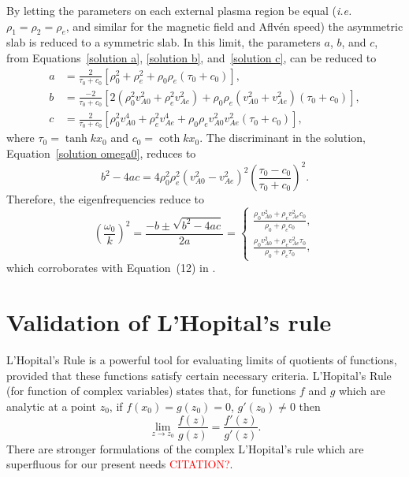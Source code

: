 \documentclass{aastex61}
\begin{document}
By letting the parameters on each external plasma region be equal (\textit{i.e.} $\rho_1 = \rho_2 = \rho_e$, and similar for the magnetic field and Aflv\'{e}n speed) the asymmetric slab is reduced to a symmetric slab. In this limit, the parameters $a$, $b$, and $c$, from Equations~\eqref{solution a}, \eqref{solution b}, and~\eqref{solution c}, can be reduced to
\begin{align}
a &= \frac{2}{\tau_0 + c_0} \left[ \rho_0^2 + \rho_e^2 + \rho_0\rho_e(\tau_0 + c_0) \right], \\
b &= \frac{-2}{\tau_0 + c_0} \left[ 2(\rho_0^2v_{A0}^2 + \rho_e^2v_{Ae}^2) + \rho_0\rho_e(v_{A0}^2 + v_{Ae}^2)(\tau_0 + c_0) \right], \\
c &= \frac{2}{\tau_0 + c_0} \left[ \rho_0^2v_{A0}^4 + \rho_e^2v_{Ae}^4 + \rho_0\rho_ev_{A0}^2v_{Ae}^2(\tau_0 + c_0) \right],
\end{align}
where $\tau_0 = \tanh{kx_0}$ and $c_0 = \coth{kx_0}$. The discriminant in the solution, Equation~\eqref{solution omega0}, reduces to
\begin{equation}
b^2 - 4ac = 4\rho_0^2\rho_e^2(v_{A0}^2 - v_{Ae}^2)^2 \left(\frac{\tau_0 - c_0}{\tau_0 + c_0}\right)^2. 
\end{equation}
Therefore, the eigenfrequencies reduce to
\begin{equation}
\left(\frac{\omega_0}{k}\right)^2 = \frac{-b \pm \sqrt{b^2 - 4ac}}{2a} =
\begin{cases}
\frac{\rho_0v_{A0}^2 + \rho_ev_{Ae}^2c_0}{\rho_0 + \rho_ec_0}, \\
\frac{\rho_0v_{A0}^2 + \rho_ev_{Ae}^2\tau_0}{\rho_0 + \rho_e\tau_0},
\end{cases}
\end{equation}
which corroborates with Equation~(12) in \cite{rob81b}.


\section{Validation of L'Hopital's rule} \label{app: l'hopital}
L'Hopital's Rule is a powerful tool for evaluating limits of quotients of functions, provided that these functions satisfy certain necessary criteria. L'Hopital's Rule (for function of complex variables) states that, for functions $f$ and $g$ which are analytic at a point $z_0$, if $f(x_0) = g(z_0) = 0$, $g'(z_0) \neq 0$ then
\begin{equation}
\lim_{z \to z_0}\frac{f(z)}{g(z)} = \frac{f'(z)}{g'(z)}.
\end{equation}
There are stronger formulations of the complex L'Hopital's rule which are superfluous for our present needs \textcolor{red}{CITATION?}.
\end{document}

